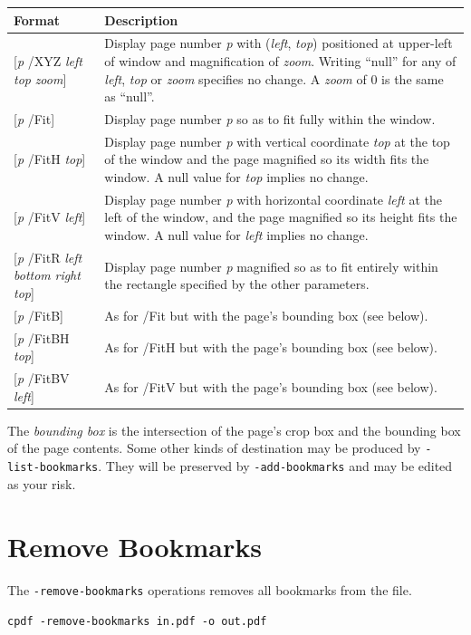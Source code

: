 \documentclass{book}
\begin{document}
\begin{tabular}{lp{8cm}}
Format & Description\\\hline
{[\textit{p} /XYZ \textit{left} \textit{top} \textit{zoom}]} & Display page number \textit{p} with (\textit{left}, \textit{top}) positioned at upper-left of window and magnification of \textit{zoom}. Writing ``null'' for any of \textit{left}, \textit{top} or \textit{zoom} specifies no change. A \textit{zoom} of 0 is the same as ``null''.\\
{[\textit{p} /Fit]} & Display page number \textit{p} so as to fit fully within the window.\\
{[\textit{p} /FitH \textit{top}]} & Display page number \textit{p} with vertical coordinate \textit{top} at the top of the window and the page magnified so its width fits the window. A null value for \textit{top} implies no change.\\
{[\textit{p} /FitV \textit{left}]} & Display page number \textit{p} with horizontal coordinate \textit{left} at the left of the window, and the page magnified so its height fits the window. A null value for \textit{left} implies no change. \\
{[\textit{p} /FitR \textit{left} \textit{bottom} \textit{right} \textit{top}]} & Display page number \textit{p} magnified so as to fit entirely within the rectangle specified by the other parameters. \\
{[\textit{p} /FitB]} & As for /Fit but with the page's bounding box (see below).\\
{[\textit{p} /FitBH \textit{top}]} & As for /FitH but with the page's bounding box (see below).\\
{[\textit{p} /FitBV \textit{left}]} & As for /FitV but with the page's bounding box (see below).
\end{tabular}

\medskip

\noindent The \textit{bounding box} is the intersection of the page's crop box and the bounding box of the page contents. Some other kinds of destination may be produced by \texttt{-list-bookmarks}. They will be preserved by \texttt{-add-bookmarks} and may be edited as your risk.


  \section{Remove Bookmarks}
  \label{removebookmarks}
  The \texttt{-remove-bookmarks} operations removes all bookmarks from the file.
  \begin{framed}
    \noindent\small\verb!cpdf -remove-bookmarks in.pdf -o out.pdf!
  \end{framed}
\end{document}
